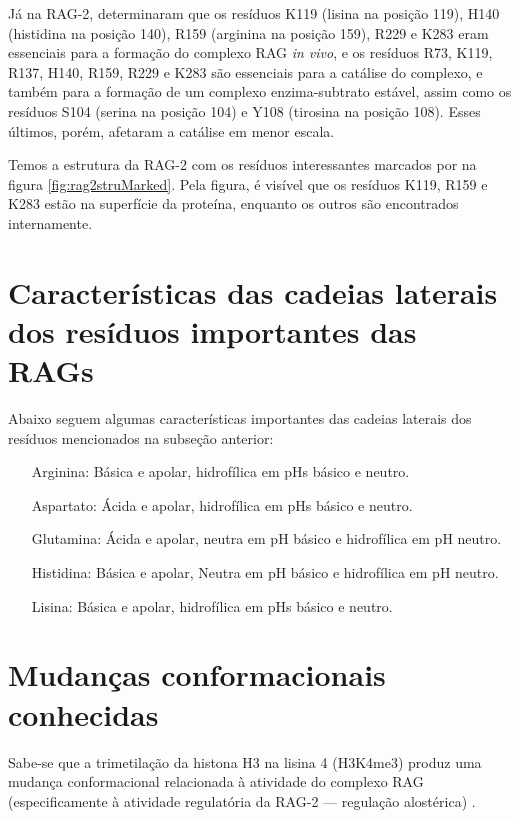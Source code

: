 \documentclass[
	12pt,				%
	openright,			%
	twoside,			%
	a4paper,			%
	]{abntex2}
\begin{document}

Já na RAG-2,  determinaram que os resíduos K119 (lisina na posição 119), H140 (histidina na posição 140), R159 (arginina na posição 159), R229 e K283 eram essenciais para a formação do complexo RAG \textit{in vivo}, e os resíduos R73, K119, R137, H140, R159, R229 e K283 são essenciais para a catálise do complexo, e também para a formação de um complexo enzima-subtrato estável, assim como os resíduos S104 (serina na posição 104) e Y108 (tirosina na posição 108). Esses últimos, porém, afetaram a catálise em menor escala.

Temos a estrutura da RAG-2 com os resíduos interessantes marcados por  na figura \ref{fig:rag2struMarked}. Pela figura, é visível que os resíduos K119, R159 e K283 estão na superfície da proteína, enquanto os outros são encontrados internamente.

\section{Características das cadeias laterais dos resíduos importantes das RAGs}

Abaixo seguem algumas características importantes das cadeias laterais dos resíduos mencionados na subseção anterior:

\begin{itemize}
	\item[Arginina:] Básica e apolar, hidrofílica em pHs básico e neutro.
	\item[Aspartato:] Ácida e apolar, hidrofílica em pHs básico e neutro.
	\item[Glutamina:] Ácida e apolar, neutra em pH básico e hidrofílica em pH neutro.
	\item[Histidina:] Básica e apolar, Neutra em pH básico e hidrofílica em pH neutro.
	\item[Lisina:] Básica e apolar, hidrofílica em pHs básico e neutro.
\end{itemize}

\section{Mudanças conformacionais conhecidas}

Sabe-se que a trimetilação da histona H3 na lisina 4 (H3K4me3) produz uma mudança conformacional relacionada à atividade do complexo RAG (especificamente à atividade regulatória da RAG-2 --- regulação alostérica) \cite{putariarandom}.
\end{document}
